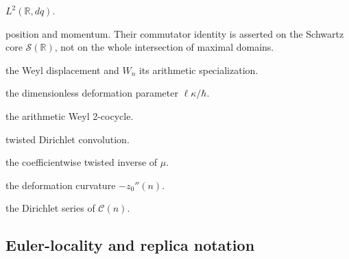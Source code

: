 \documentclass[11pt]{amsart}
\numberwithin{equation}{section}
\theoremstyle{plain}
\theoremstyle{definition}
\theoremstyle{remark}
\newcommand{\Hil}{\mathcal{H}}
\newcommand{\Sch}{\mathcal{S}}
\begin{document}
\begin{description}[leftmargin=3.2cm,style=nextline]
\item[\(\Hil\)] \(L^2(\mathbb R,dq)\).
\item[\(Q,P\)] position and momentum.  Their commutator identity is asserted
on the Schwartz core \(\Sch(\mathbb R)\), not on the whole intersection of
maximal domains.
\item[\(W(x,y)\)] the Weyl displacement and \(W_n\) its arithmetic
specialization.
\item[\(\vartheta\)] the dimensionless deformation parameter
\(\ell\kappa/\hbar\).
\item[\(\chi_\vartheta(m,n)\)] the arithmetic Weyl 2-cocycle.
\item[\(\star_\vartheta\)] twisted Dirichlet convolution.
\item[\(z_\vartheta(n)\)] the coefficientwise twisted inverse of \(\mu\).
\item[\(\mathcal C(n)\)] the deformation curvature \(-z_0''(n)\).
\item[\(\mathcal K(s)\)] the Dirichlet series of \(\mathcal C(n)\).
\end{description}

\subsection{Euler-locality and replica notation}
\label{subsec:notation_replica}
\end{document}
